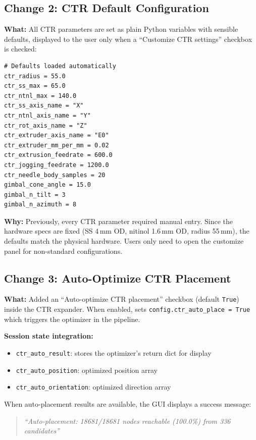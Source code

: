 \documentclass[11pt,a4paper]{article}
\begin{document}
\subsection{Change 2: CTR Default Configuration}

\textbf{What:} All CTR parameters are set as plain Python variables with sensible defaults, displayed to the user only when a ``Customize CTR settings'' checkbox is checked:

\begin{lstlisting}
# Defaults loaded automatically
ctr_radius = 55.0
ctr_ss_max = 65.0
ctr_ntnl_max = 140.0
ctr_ss_axis_name = "X"
ctr_ntnl_axis_name = "Y"
ctr_rot_axis_name = "Z"
ctr_extruder_axis_name = "E0"
ctr_extruder_mm_per_mm = 0.02
ctr_extrusion_feedrate = 600.0
ctr_jogging_feedrate = 1200.0
ctr_needle_body_samples = 20
gimbal_cone_angle = 15.0
gimbal_n_tilt = 3
gimbal_n_azimuth = 8
\end{lstlisting}

\textbf{Why:} Previously, every CTR parameter required manual entry. Since the hardware specs are fixed (SS 4\,mm OD, nitinol 1.6\,mm OD, radius 55\,mm), the defaults match the physical hardware. Users only need to open the customize panel for non-standard configurations.

\subsection{Change 3: Auto-Optimize CTR Placement}

\textbf{What:} Added an ``Auto-optimize CTR placement'' checkbox (default \texttt{True}) inside the CTR expander. When enabled, sets \texttt{config.ctr\_auto\_place = True} which triggers the optimizer in the pipeline.

\textbf{Session state integration:}
\begin{itemize}[nosep]
    \item \texttt{ctr\_auto\_result}: stores the optimizer's return dict for display
    \item \texttt{ctr\_auto\_position}: optimized position array
    \item \texttt{ctr\_auto\_orientation}: optimized direction array
\end{itemize}

When auto-placement results are available, the GUI displays a success message:
\begin{quote}
\textit{``Auto-placement: 18681/18681 nodes reachable (100.0\%) from 336 candidates''}
\end{quote}
\end{document}

